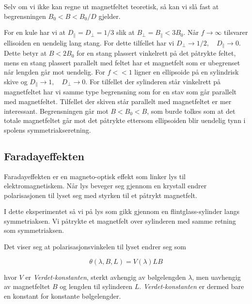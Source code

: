 \documentclass[a4paper,11pt, twocolumn]{article}
\begin{document}
Selv om vi ikke kan regne ut magnetfeltet teoretisk, så kan vi slå fast at begrensningen $B_0<B<B_0/D$ gjelder.

For en kule har vi at $D_\parallel=D_\perp=1/3$ slik at $B_\perp = B_\parallel <3B_0$. Når $f\rightarrow\infty$ tilsvarer ellisoiden en uendelig lang stang. For dette tilfellet har vi $D_\perp\rightarrow 1/2, \quad D_\parallel\rightarrow 0$. Dette betyr at $B<2B_0$ for en stang plassert vinkelrett på det påtrykte feltet, mens en stang plassert parallelt med feltet har et magnetfelt som er ubegrenset når lengden går mot uendelig. For $f<<1$ ligner en ellipsoide på en sylindrisk skive og $D_\parallel\rightarrow 1, \quad D_\perp\rightarrow 0$. For tilfellet der sylinderen står vinkelrett på magnetfeltet har vi samme type begrensning som for en stav som går parallelt med magnetfeltet. Tilfellet der skiven står parallelt med magnetfeltet er mer interessant. Begrensningen går mot $B<B_0<B$, som burde tolkes som at det totale magnetfeltet går mot det påtrykte ettersom ellipsoiden blir uendelig tynn i spolens symmetriakseretning.

\subsection{Faradayeffekten}
Faradayeffekten er en magneto-optisk effekt som linker lys til elektromagnetiskem. Når lys beveger seg gjennom en krystall endrer polarisasjonen til lyset seg med styrken til et påtrykt magnetfelt.

I dette eksperimentet så vi på lys som gikk gjennom en flintglass-sylinder langs symmetriaksen. Vi påtrykte et magnetfelt over sylinderen med samme retning som symmetriaksen.

Det viser seg at polarisasjonsvinkelen til lyset endrer seg som

\begin{equation}
	\theta(\lambda, B, L) = V(\lambda)LB
	\label{eq:verdet}
\end{equation}

hvor $V$ er \textit{Verdet-konstanten}, sterkt avhengig av bølgelengden $\lambda$, men uavhengig av magnetfeltet $B$ og lengden til sylinderen $L$. \textit{Verdet-konstanten} er dermed bare en konstant for konstante bølgelengder.
\end{document}
